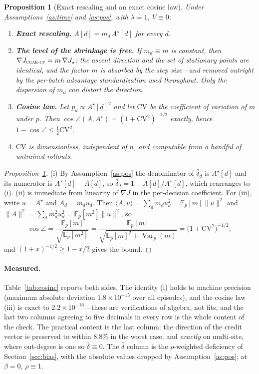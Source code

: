 \documentclass[review,authoryear,3p,times]{elsarticle}
\newtheorem{proposition}{Proposition}
\newcommand{\cflow}{\textsc{cgae-cf}}          %
\newcommand{\Ex}{\mathbb{E}}
\newcommand{\Var}{\operatorname{Var}}
\begin{document}
\begin{proposition}[Exact rescaling and an exact cosine law]
\label{prop:rel}
Under Assumptions~\ref{as:time} and \ref{as:pos}, with $\lambda=1$, $V\equiv0$:
\begin{enumerate}
\item[(i)] \textbf{Exact rescaling.} $A[d]=m_d\,A^{\star}[d]$ for every $d$.
\item[(ii)] \textbf{The level of the shrinkage is free.} If $m_d\equiv m$ is
constant, then $\nabla J_{\cflow}=m\,\nabla J_{\star}$: the ascent direction and
the set of stationary points are \emph{identical}, and the factor $m$ is
absorbed by the step size---and removed outright by the per-batch advantage
standardization used throughout. Only the \emph{dispersion} of $m_d$ can distort
the direction.
\item[(iii)] \textbf{Cosine law.} Let $p_d \propto A^{\star}[d]^2$ and let
$\mathrm{CV}$ be the coefficient of variation of $m$ under $p$. Then
$\cos\angle(A, A^{\star}) = (1+\mathrm{CV}^2)^{-1/2}$ exactly, hence
$1-\cos\angle \le \tfrac{1}{2}\mathrm{CV}^2$.
\item[(iv)] $\mathrm{CV}$ is dimensionless, independent of $n$, and computable
from a handful of untrained rollouts.
\end{enumerate}
\end{proposition}

\begin{proof}[Proposition~\ref{prop:rel}]
(i) By Assumption~\ref{as:pos} the denominator of $\bar\delta_d$ is
$A^{\star}[d]$ and its numerator is $A^{\star}[d]-A[d]$, so
$\bar\delta_d = 1 - A[d]/A^{\star}[d]$, which rearranges to (i). (ii) is
immediate from linearity of $\nabla J$ in the per-decision coefficient. For
(iii), write $u=A^{\star}$ and $A_d=m_d u_d$. Then
$\langle A,u\rangle=\sum_d m_d u_d^2=\Ex_p[m]\lVert u\rVert^2$ and
$\lVert A\rVert^2=\sum_d m_d^2u_d^2=\Ex_p[m^2]\lVert u\rVert^2$, so
\[
  \cos\angle=\frac{\Ex_p[m]}{\sqrt{\Ex_p[m^2]}}
           =\frac{\Ex_p[m]}{\sqrt{\Ex_p[m]^2+\Var_p(m)}}
           =\bigl(1+\mathrm{CV}^2\bigr)^{-1/2},
\]
and $(1+x)^{-1/2}\ge 1-x/2$ gives the bound.
\end{proof}


\paragraph{Measured.} Table~\ref{tab:cosine} reports both sides. The identity
(i) holds to machine precision (maximum absolute deviation $1.8\times10^{-15}$
over all episodes), and the cosine law (iii) is exact to
$2.2\times10^{-16}$---these are verifications of algebra, not fits, and the
last two columns agreeing to five decimals in every row is the whole content of
the check. The practical content is the last column: the direction of the
credit vector is preserved to within $8.8\%$ in the worst case, and
\emph{exactly} on multi-site, where out-degree is one so $\bar\delta\equiv0$.
The $\bar\delta$ column is the $\rho$-weighted deficiency of
Section~\ref{sec:bias}, with the absolute values dropped by
Assumption~\ref{as:pos}; at $\beta=0$, $\rho\equiv1$.
\end{document}
